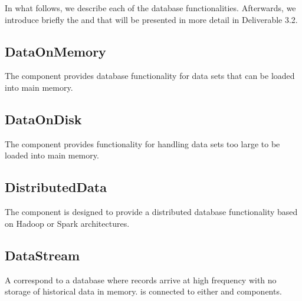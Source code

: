 In what follows, we describe each of the database functionalities. Afterwards, we introduce briefly the  and  that will be presented in more detail in Deliverable 3.2.
 
 
\subsection{DataOnMemory}

The  component provides database functionality for data sets that can be loaded into main memory.

\subsection{DataOnDisk}

The  component provides functionality for handling data sets too large to be loaded into main memory.

\subsection{DistributedData}

The  component is designed to provide a distributed database functionality based on Hadoop or Spark architectures. 
 
 
\subsection{DataStream}

A  correspond to a database where records arrive at high frequency with no storage of historical data in memory.  is connected to either  and  components. 

